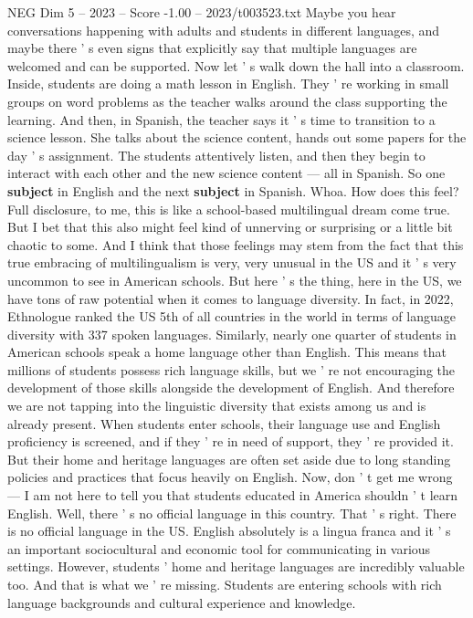 \begin{textsample}{NEG Dim 5 – 2023 – Score -1.00 – 2023/t003523.txt}
Maybe you hear conversations happening with adults and students in different languages, and maybe there ' s even signs that explicitly say that multiple languages are welcomed and can be supported.
Now let ' s walk down the hall into a classroom.
Inside, students are doing a math lesson in English.
They ' re working in small groups on word problems as the teacher walks around the class supporting the learning.
And then, in Spanish, the teacher says it ' s time to transition to a science lesson.
She talks about the science content, hands out some papers for the day ' s assignment.
The students attentively listen, and then they begin to interact with each other and the new science content — all in Spanish.
So one \textbf{subject} in English and the next \textbf{subject} in Spanish.
Whoa.
How does this feel?
Full disclosure, to me, this is like a school-based multilingual dream come true.
But I bet that this also might feel kind of unnerving or surprising or a little bit chaotic to some.
And I think that those feelings may stem from the fact that this true embracing of multilingualism is very, very unusual in the US and it ' s very uncommon to see in American schools.
But here ' s the thing, here in the US, we have tons of raw potential when it comes to language diversity.
In fact, in 2022, Ethnologue ranked the US 5th of all countries in the world in terms of language diversity with 337 spoken languages.
Similarly, nearly one quarter of students in American schools speak a home language other than English.
This means that millions of students possess rich language skills, but we ' re not encouraging the development of those skills alongside the development of English.
And therefore we are not tapping into the linguistic diversity that exists among us and is already present.
When students enter schools, their language use and English proficiency is screened, and if they ' re in need of support, they ' re provided it.
But their home and heritage languages are often set aside due to long standing policies and practices that focus heavily on English.
Now, don ' t get me wrong — I am not here to tell you that students educated in America shouldn ' t learn English.
Well, there ' s no official language in this country.
That ' s right.
There is no official language in the US.
English absolutely is a lingua franca and it ' s an important sociocultural and economic tool for communicating in various settings.
However, students ' home and heritage languages are incredibly valuable too.
And that is what we ' re missing.
Students are entering schools with rich language backgrounds and cultural experience and knowledge.

\end{textsample}
